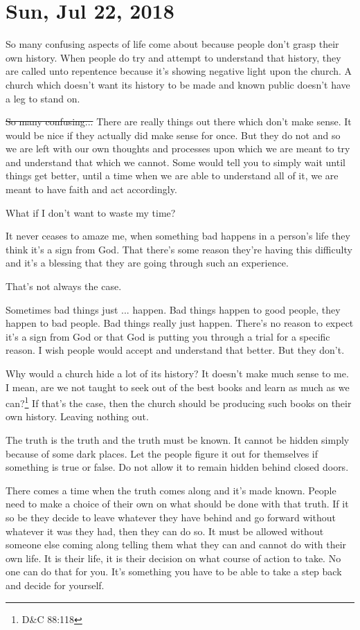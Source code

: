 \section{Sun, Jul 22, 2018}

So many confusing aspects of life come about because people don't grasp their own
history. When people do try and attempt to understand that history, they are called
unto repentence because it's showing negative light upon the church. A church which
doesn't want its history to be made and known public doesn't have a leg to stand on.

\st{So many confusing...} There are really things out there which don't make sense.
It would be nice if they actually did make sense for once. But they do not and so we
are left with our own thoughts and processes upon which we are meant to try and
understand that which we cannot. Some would tell you to simply wait until things get
better, until a time when we are able to understand all of it, we are meant to have
faith and act accordingly.

What if I don't want to waste my time?

It never ceases to amaze me, when something bad happens in a person's life they think
it's a sign from God. That there's some reason they're having this difficulty and
it's a blessing that they are going through such an experience.

That's not always the case.

Sometimes bad things just ... happen. Bad things happen to good people, they happen
to bad people. Bad things really just happen. There's no reason to expect it's a sign
from God or that God is putting you through a trial for a specific reason. I wish
people would accept and understand that better. But they don't.

Why would a church hide a lot of its history? It doesn't make much sense to me. I
mean, are we not taught to seek out of the best books and learn as much as we 
can?\footnote{D\&C 88:118} If that's the case, then the church should be producing 
such books on their own history. Leaving nothing out.

The truth is the truth and the truth must be known. It cannot be
hidden simply because of some dark places. Let the people figure it out for
themselves if something is true or false. Do not allow it to remain hidden behind
closed doors.

There comes a time when the truth comes along and it's made known. People need to
make a choice of their own on what should be done with that truth. If it so be they
decide to leave whatever they have behind and go forward without whatever it was they
had, then they can do so. It must be allowed without someone else coming along
telling them what they can and cannot do with their own life. It is their life, it is
their decision on what course of action to take. No one can do that for you. It's
something you have to be able to take a step back and decide for yourself.

